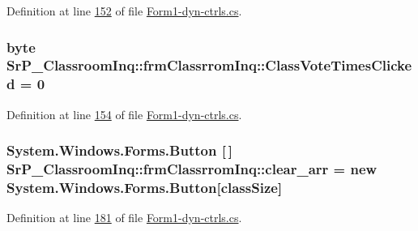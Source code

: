 \-Definition at line \hyperlink{_form1-dyn-ctrls_8cs_source_l00152}{152} of file \hyperlink{_form1-dyn-ctrls_8cs_source}{\-Form1-\/dyn-\/ctrls.\-cs}.

\hypertarget{class_sr_p___classroom_inq_1_1frm_classrrom_inq_ab63c943c019363dba6aa86686b9f2bf6}{
\subsubsection[{\-Class\-Vote\-Times\-Clicked}]{\setlength{\rightskip}{0pt plus 5cm}byte {\bf \-Sr\-P\-\_\-\-Classroom\-Inq\-::frm\-Classrrom\-Inq\-::\-Class\-Vote\-Times\-Clicked} = 0}}
\label{class_sr_p___classroom_inq_1_1frm_classrrom_inq_ab63c943c019363dba6aa86686b9f2bf6}


\-Definition at line \hyperlink{_form1-dyn-ctrls_8cs_source_l00154}{154} of file \hyperlink{_form1-dyn-ctrls_8cs_source}{\-Form1-\/dyn-\/ctrls.\-cs}.

\hypertarget{class_sr_p___classroom_inq_1_1frm_classrrom_inq_a1c427c3d5bb61c96ca798e5f6aaff8f4}{
\subsubsection[{clear\-\_\-arr}]{\setlength{\rightskip}{0pt plus 5cm}\-System.\-Windows.\-Forms.\-Button \mbox{[}$\,$\mbox{]} {\bf \-Sr\-P\-\_\-\-Classroom\-Inq\-::frm\-Classrrom\-Inq\-::clear\-\_\-arr} = new \-System.\-Windows.\-Forms.\-Button\mbox{[}{\bf class\-Size}\mbox{]}}}
\label{class_sr_p___classroom_inq_1_1frm_classrrom_inq_a1c427c3d5bb61c96ca798e5f6aaff8f4}


\-Definition at line \hyperlink{_form1-dyn-ctrls_8cs_source_l00181}{181} of file \hyperlink{_form1-dyn-ctrls_8cs_source}{\-Form1-\/dyn-\/ctrls.\-cs}.

